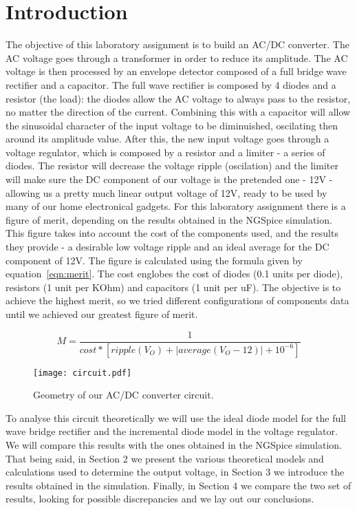 \section{Introduction}
\label{sec:introduction}
The objective of this laboratory assignment is to build an AC/DC converter. The AC voltage goes through a transformer in order to reduce its amplitude. The AC voltage is then processed by an envelope detector composed of a full bridge wave rectifier and a capacitor. The full wave rectifier is composed by 4 diodes and a resistor (the load): the diodes allow the AC voltage to always pass to the resistor, no matter the direction of the current. Combining this with a capacitor will allow the sinusoidal character of the input voltage to be diminuished, oscilating then around its amplitude value. After this, the new input voltage goes through a voltage regulator, which is composed by a resistor and a limiter - a series of diodes. The resistor will decrease the voltage ripple (oscilation) and the limiter will make sure the DC component of our voltage is the pretended one - 12V - allowing us a pretty much linear output voltage of 12V, ready to be used by many of our home electronical gadgets.
For this laboratory assignment there is a figure of merit, depending on the results obtained in the NGSpice simulation. This figure takes into account the cost of the components used, and the results they provide - a desirable low voltage ripple and an ideal average for the DC component of 12V. The figure is calculated using the formula given by equation~\ref{eqn:merit}. The cost englobes the cost of diodes (0.1 units per diode), resistors (1 unit per KOhm) and capacitors (1 unit per uF). The objective is to achieve the highest merit, so we tried different configurations of components data until we achieved our greatest figure of merit.

\begin{equation}
\label{eqn:merit}
M=\frac{1}{cost*[ripple(V_O) + |average(V_O - 12)| + 10^{-6}]}
\end{equation}

\begin{figure}[h] \centering
\texttt{[image: circuit.pdf]}
\caption{Geometry of our AC/DC converter circuit.}
\end{figure}

To analyse this circuit theoretically we will use the ideal diode model for the full wave bridge rectifier and the incremental diode model in the voltage regulator. We will compare this results with the ones obtained in the NGSpice simulation.
That being said, in Section 2 we present the various theoretical models and calculations used to determine the output voltage, in Section 3 we introduce the results obtained in the simulation. Finally, in Section 4 we compare the two set of results, looking for possible discrepancies and we lay out our conclusions.

